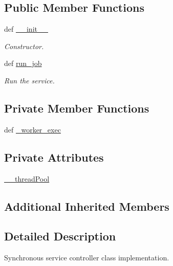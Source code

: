 \subsection*{Public Member Functions}
\begin{DoxyCompactItemize}
\item 
def \hyperlink{classRappCloud_1_1ServiceController_1_1ServiceControllerAsync_1_1ServiceControllerAsync_ace2e2145c0d5eacdcdcfc35abf8fe38f}{\-\_\-\-\_\-init\-\_\-\-\_\-}
\begin{DoxyCompactList}\small\item\em Constructor. \end{DoxyCompactList}\item 
def \hyperlink{classRappCloud_1_1ServiceController_1_1ServiceControllerAsync_1_1ServiceControllerAsync_aeafa437bf85355e8f454d04e4ff22441}{run\-\_\-job}
\begin{DoxyCompactList}\small\item\em Run the service. \end{DoxyCompactList}\end{DoxyCompactItemize}
\subsection*{Private Member Functions}
\begin{DoxyCompactItemize}
\item 
def \hyperlink{classRappCloud_1_1ServiceController_1_1ServiceControllerAsync_1_1ServiceControllerAsync_a73a32e67eda63747cf7472bcebd8bfd7}{\-\_\-worker\-\_\-exec}
\end{DoxyCompactItemize}
\subsection*{Private Attributes}
\begin{DoxyCompactItemize}
\item 
\hyperlink{classRappCloud_1_1ServiceController_1_1ServiceControllerAsync_1_1ServiceControllerAsync_a1fac92ab781148dc7a9f2881c0757a85}{\-\_\-\-\_\-thread\-Pool}
\end{DoxyCompactItemize}
\subsection*{Additional Inherited Members}


\subsection{Detailed Description}
\begin{DoxyVerb}Synchronous service controller class implementation. \end{DoxyVerb}
 

